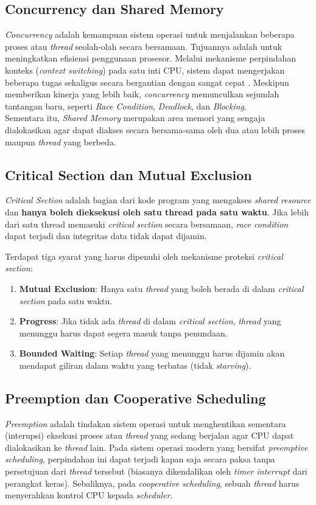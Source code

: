 \subsection{Concurrency dan Shared Memory}
\textit{Concurrency} adalah kemampuan sistem operasi untuk menjalankan beberapa proses atau \textit{thread} seolah-olah secara bersamaan. Tujuannya adalah untuk meningkatkan efisiensi penggunaan prosesor. Melalui mekanisme perpindahan konteks (\textit{context switching}) pada satu inti CPU, sistem dapat mengerjakan beberapa tugas sekaligus secara bergantian dengan sangat cepat \cite{noauthor_concurrency_nodate}. Meskipun memberikan kinerja yang lebih baik, \textit{concurrency} memunculkan sejumlah tantangan baru, seperti \textit{Race Condition}, \textit{Deadlock}, dan \textit{Blocking}. \\

Sementara itu, \textit{Shared Memory} merupakan area memori yang sengaja dialokasikan agar dapat diakses secara bersama-sama oleh dua atau lebih proses maupun \textit{thread} yang berbeda.

\subsection{Critical Section dan Mutual Exclusion}
\textit{Critical Section} adalah bagian dari kode program yang mengakses \textit{shared resource} dan \textbf{hanya boleh dieksekusi oleh satu thread pada satu waktu}.
Jika lebih dari satu thread memasuki \textit{critical section} secara bersamaan, \textit{race condition} dapat terjadi dan integritas data tidak dapat dijamin.

Terdapat tiga syarat yang harus dipenuhi oleh mekanisme proteksi \textit{critical section}:
\begin{enumerate}
	\item \textbf{Mutual Exclusion}: Hanya satu \textit{thread} yang boleh berada di dalam \textit{critical section} pada satu waktu.
	\item \textbf{Progress}: Jika tidak ada \textit{thread} di dalam \textit{critical section}, \textit{thread} yang menunggu harus dapat segera masuk tanpa penundaan.
	\item \textbf{Bounded Waiting}: Setiap \textit{thread} yang menunggu harus dijamin akan mendapat giliran dalam waktu yang terbatas (tidak \textit{starving}).
\end{enumerate}

\subsection{Preemption dan Cooperative Scheduling}
\textit{Preemption} adalah tindakan sistem operasi untuk menghentikan sementara (interupsi) eksekusi proses atau \textit{thread} yang sedang berjalan agar CPU dapat dialokasikan ke \textit{thread} lain.
Pada sistem operasi modern yang bersifat \textit{preemptive scheduling}, perpindahan ini dapat terjadi kapan saja secara paksa tanpa persetujuan dari \textit{thread} tersebut (biasanya dikendalikan oleh \textit{timer interrupt} dari perangkat keras).
Sebaliknya, pada \textit{cooperative scheduling}, sebuah \textit{thread} harus menyerahkan kontrol CPU kepada \textit{scheduler}.

